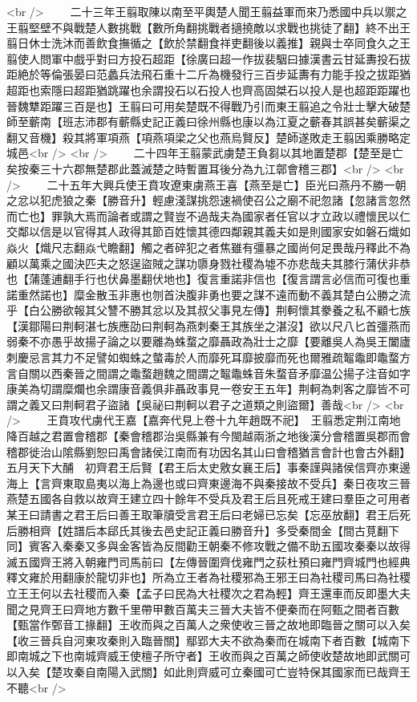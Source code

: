 <br />
　　二十三年王翦取陳以南至平輿楚人聞王翦益軍而來乃悉國中兵以禦之王翦堅壁不與戰楚人數挑戰【數所角翻挑戰者擿撓敵以求戰也挑徒了翻】終不出王翦日休士洗沐而善飲食撫循之【飲於禁翻食祥吏翻後以義推】親與士卒同食久之王翦使人問軍中戲乎對曰方投石超距【徐廣曰超一作拔裴駰曰據漢書云甘延夀投石拔距絶於等倫張晏曰范蠡兵法飛石重十二斤為機發行三百步延夀有力能手投之拔距猶超距也索隱曰超距猶跳躍也余謂投石以石投人也齊高固桀石以投人是也超距距躍也晉魏犨距躍三百是也】王翦曰可用矣楚既不得戰乃引而東王翦追之令壯士擊大破楚師至蘄南【班志沛郡有蘄縣史記正義曰徐州縣也康以為江夏之蘄春其誤甚矣蘄渠之翻又音機】殺其將軍項燕【項燕項梁之父也燕烏賢反】楚師遂敗走王翦因乘勝略定城邑<br />
<br />
　　二十四年王翦蒙武虜楚王負芻以其地置楚郡【楚至是亡矣按秦三十六郡無楚郡此蓋滅楚之時暫置耳後分為九江鄣會稽三郡】<br />
<br />
　　二十五年大興兵使王賁攻遼東虜燕王喜【燕至是亡】臣光曰燕丹不勝一朝之忿以犯虎狼之秦【勝音升】輕慮淺謀挑怨速禍使召公之廟不祀忽諸【忽諸言忽然而亡也】罪孰大焉而論者或謂之賢豈不過哉夫為國家者任官以才立政以禮懷民以仁交鄰以信是以官得其人政得其節百姓懷其德四鄰親其義夫如是則國家安如磐石熾如焱火【熾尺志翻焱弋瞻翻】觸之者碎犯之者焦雖有彊暴之國尚何足畏哉丹釋此不為顧以萬乘之國決匹夫之怒逞盜賊之謀功隳身戮社稷為墟不亦悲哉夫其膝行蒲伏非恭也【蒲蓬逋翻手行也伏鼻墨翻伏地也】復言重諾非信也【復言謂言必信而可復也重諾重然諾也】糜金散玉非惠也刎首決腹非勇也要之謀不遠而動不義其楚白公勝之流乎【白公勝欲報其父讐不勝其忿以及其叔父事見左傳】荆軻懷其豢養之私不顧七族【漢鄒陽曰荆軻湛七族應劭曰荆軻為燕刺秦王其族坐之湛沒】欲以尺八匕首彊燕而弱秦不亦愚乎故揚子論之以要離為蛛蝥之靡聶政為壯士之靡【要離吳人為吳王闔廬刺慶忌言其力不足譬如蜘蛛之螫毒於人而靡死耳靡披靡而死也爾雅疏鼅鼄即鼄蝥方言自關以西秦晉之間謂之鼄蝥趙魏之間謂之鼅鼄蛛音朱蝥音矛靡温公揚子注音如字康美為切謂糜爛也余謂康音義俱非聶政事見一卷安王五年】荆軻為刺客之靡皆不可謂之義又曰荆軻君子盜諸【吳祕曰荆軻以君子之道類之則盜爾】善哉<br />
<br />
　　王賁攻代虜代王嘉【嘉奔代見上卷十九年趙既不祀】　王翦悉定荆江南地降百越之君置會稽郡【秦會稽郡治吳縣兼有今閩越兩浙之地後漢分會稽置吳郡而會稽郡徙治山隂縣劉恕曰禹會諸侯江南而有功因名其山曰會稽猶言會計也會古外翻】　五月天下大酺　初齊君王后賢【君王后太史敫女襄王后】事秦謹與諸侯信齊亦東邊海上【言齊東取島夷以海上為邊也或曰齊東邊海不與秦接故不受兵】秦日夜攻三晉燕楚五國各自救以故齊王建立四十餘年不受兵及君王后且死戒王建曰羣臣之可用者某王曰請書之君王后曰善王取筆牘受言君王后曰老婦已忘矣【忘巫放翻】君王后死后勝相齊【姓譜后本郈氏其後去邑史記正義曰勝音升】多受秦間金【間古莧翻下同】賓客入秦秦又多與金客皆為反間勸王朝秦不修攻戰之備不助五國攻秦秦以故得滅五國齊王將入朝雍門司馬前曰【左傳晉圍齊伐雍門之荻杜預曰雍門齊城門也經典釋文雍於用翻康於龍切非也】所為立王者為社稷邪為王邪王曰為社稷司馬曰為社稷立王王何以去社稷而入秦【孟子曰民為大社稷次之君為輕】齊王還車而反即墨大夫聞之見齊王曰齊地方數千里帶甲數百萬夫三晉大夫皆不便秦而在阿甄之間者百數【甄當作鄄音工掾翻】王收而與之百萬人之衆使收三晉之故地即臨晉之關可以入矣【收三晉兵自河東攻秦則入臨晉關】鄢郢大夫不欲為秦而在城南下者百數【城南下即南城之下也南城齊威王使檀子所守者】王收而與之百萬之師使收楚故地即武關可以入矣【楚攻秦自南陽入武關】如此則齊威可立秦國可亡豈特保其國家而已哉齊王不聽<br />
